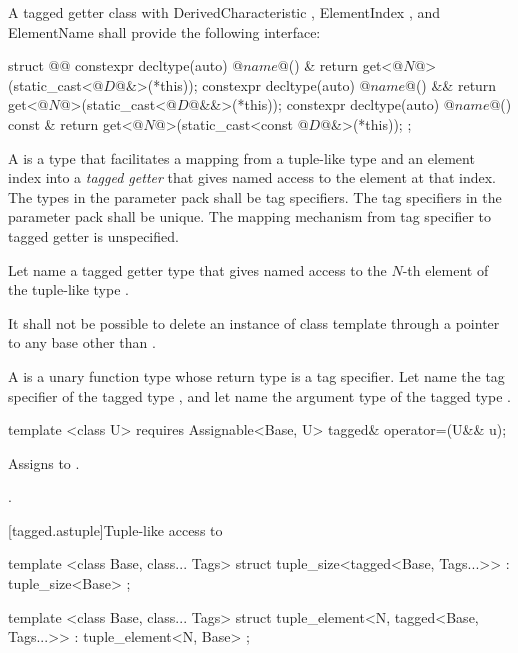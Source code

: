 {\pnum A tagged getter class with DerivedCharacteristic , ElementIndex
, and ElementName  shall provide the following interface:

\begin{codeblock}
struct @@ {
  constexpr decltype(auto) @$name$@() &       { return get<@$N$@>(static_cast<@$D$@&>(*this)); }
  constexpr decltype(auto) @$name$@() &&      { return get<@$N$@>(static_cast<@$D$@&&>(*this)); }
  constexpr decltype(auto) @$name$@() const & { return get<@$N$@>(static_cast<const @$D$@&>(*this)); }
};
\end{codeblock}

\pnum A  is a type that facilitates a mapping from a tuple-like type and an
element index into a \textit{tagged getter} that gives named access to the element at that index.
The types in the  parameter pack shall be tag specifiers. The tag specifiers in the
 parameter pack shall be unique. \enternote The mapping mechanism from tag specifier to
tagged getter is unspecified.\exitnote

\pnum Let  name a tagged getter type that gives named
access to the $N$-th element of the tuple-like type .

\pnum It shall not be possible to delete an instance of class template  through a
pointer to any base other than .

\pnum A  is a unary function type whose return type is a tag specifier. Let
 name the tag specifier of the tagged type , and let
 name the argument type of the tagged type .

\begin{itemdecl}
template <class U>
  requires Assignable<Base, U>
tagged& operator=(U&& u);
\end{itemdecl}

\begin{itemdescr}
\pnum
\effects Assigns  to .

\pnum
\returns {}.
\end{itemdescr}

[tagged.astuple]{Tuple-like access to }

%
\begin{itemdecl}
template <class Base, class... Tags>
struct tuple_size<tagged<Base, Tags...>>
  : tuple_size<Base> { };
\end{itemdecl}

%
\begin{itemdecl}
template <class Base, class... Tags>
struct tuple_element<N, tagged<Base, Tags...>>
  : tuple_element<N, Base> { };
\end{itemdecl}
}

